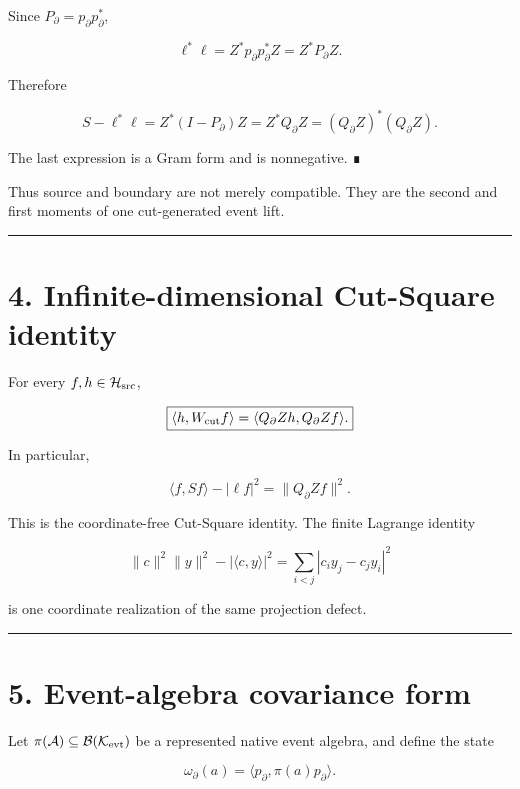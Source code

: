 Since \(P_\partial=p_\partial p_\partial^*\),

\[
\ell^*\ell
=Z^*p_\partial p_\partial^*Z
=Z^*P_\partial Z.
\]

Therefore

\[
S-\ell^*\ell
=Z^*(I-P_\partial)Z
=Z^*Q_\partial Z
=(Q_\partial Z)^*(Q_\partial Z).
\]

The last expression is a Gram form and is nonnegative. ∎

Thus source and boundary are not merely compatible. They are the second and
first moments of one cut-generated event lift.

\begin{center}\rule{0.5\linewidth}{0.5pt}\end{center}

\hypertarget{infinite-dimensional-cut-square-identity}{%
\section{4. Infinite-dimensional Cut-Square identity}\label{infinite-dimensional-cut-square-identity}}

For every \(f,h\in\mathcal H_{\rm src}\),

\[
\boxed{
\langle h,W_{\rm cut}f\rangle
=
\langle Q_\partial Zh,Q_\partial Zf\rangle.
}
\]

In particular,

\[
\boxed{
\langle f,Sf\rangle
-|\ell f|^2
=
\|Q_\partial Zf\|^2.
}
\]

This is the coordinate-free Cut-Square identity. The finite Lagrange identity

\[
\|c\|^2\|y\|^2-|\langle c,y\rangle|^2
=
\sum_{i<j}|c_i y_j-c_j y_i|^2
\]

is one coordinate realization of the same projection defect.

\begin{center}\rule{0.5\linewidth}{0.5pt}\end{center}

\hypertarget{event-algebra-covariance-form}{%
\section{5. Event-algebra covariance form}\label{event-algebra-covariance-form}}

Let \(\pi(\mathcal A)\subseteq\mathcal B(\mathcal K_{\rm evt})\) be a represented
native event algebra, and define the state

\[
\omega_\partial(a)
=\langle p_\partial,\pi(a)p_\partial\rangle.
\]

